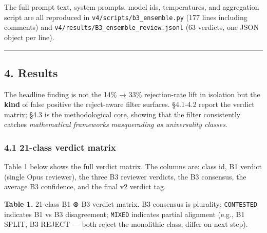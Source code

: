 \documentclass[
  letterpaper,
  11pt]{article}
\begin{document}
The full prompt text, system prompts, model ids, temperatures, and
aggregation script are all reproduced in
\texttt{v4/scripts/b3\_ensemble.py} (177 lines including comments) and
\texttt{v4/results/B3\_ensemble\_review.jsonl} (63 verdicts, one JSON
object per line).

\begin{center}\rule{0.5\linewidth}{0.5pt}\end{center}

\subsection{4. Results}\label{results}

The headline finding is not the 14\% → 33\% rejection-rate lift in
isolation but the \textbf{kind} of false positive the reject-aware
filter surfaces. §4.1-4.2 report the verdict matrix; §4.3 is the
methodological core, showing that the filter consistently catches
\emph{mathematical frameworks masquerading as universality classes}.

\subsubsection{4.1 21-class verdict matrix}\label{class-verdict-matrix}

Table 1 below shows the full verdict matrix. The columns are: class id,
B1 verdict (single Opus reviewer), the three B3 reviewer verdicts, the
B3 consensus, the average B3 confidence, and the final v2 verdict tag.

\textbf{Table 1.} 21-class B1 ⊗ B3 verdict matrix. B3 consensus is
plurality; \texttt{CONTESTED} indicates B1 vs B3 disagreement;
\texttt{MIXED} indicates partial alignment (e.g., B1 SPLIT, B3 REJECT
--- both reject the monolithic class, differ on next step).
\end{document}
